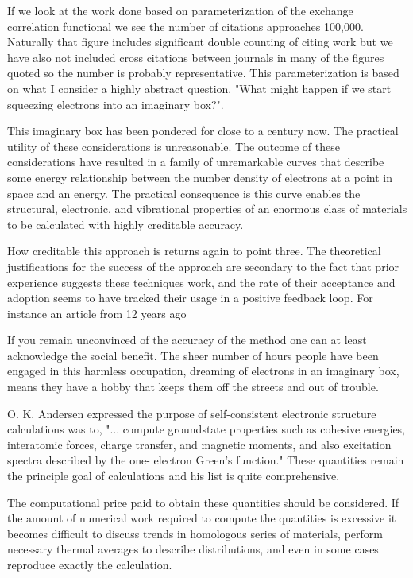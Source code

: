 If we look at the work done based on parameterization of the exchange correlation functional we see the number of citations approaches 100,000. 
Naturally that figure includes significant double counting of citing work but we have also not included cross citations between journals in many of the 
figures quoted so the number is probably representative. This parameterization is based on what I consider a highly abstract question.
"What might happen if we start squeezing electrons into an imaginary box?".

This imaginary box has been pondered for close to a century now. The practical utility of these considerations is unreasonable. 
The outcome of these considerations have resulted in a family of unremarkable curves that describe some energy relationship between
the number density of electrons at a point in space and an energy. The practical consequence is this curve enables the
structural, electronic, and vibrational properties of an enormous class of materials to be calculated with highly creditable accuracy.

How creditable this approach is returns again to point three. The theoretical justifications for the success of the approach are
secondary to the fact that prior experience suggests these techniques work, and the rate of their acceptance and adoption
seems to have tracked their usage in a positive feedback loop. For instance an article from 12 years ago 

If you remain unconvinced of the accuracy of the method one can at least acknowledge the social benefit. 
The sheer number of hours people have been engaged in this harmless occupation, dreaming of 
electrons in an imaginary box, means they have a hobby that keeps them off the streets and out of trouble.

O. K. Andersen expressed the purpose of self-consistent electronic structure calculations was to,
"... compute groundstate properties such as cohesive energies, interatomic forces, charge transfer, and magnetic moments,
and also excitation spectra described by the one- electron Green's function." \cite{anderson75} These quantities remain the
principle goal of calculations and his list is quite comprehensive. 

The computational price paid to obtain these quantities should be considered. If the amount of numerical
work required to compute the quantities is excessive it becomes difficult to discuss trends in homologous series of materials, perform
necessary thermal averages to describe distributions, and even in some cases reproduce exactly the calculation.

